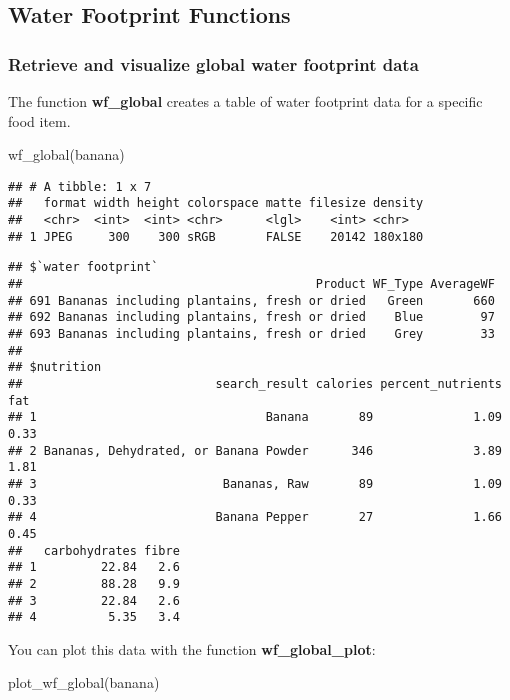 \documentclass[
]{article}
\newenvironment{Shaded}{\begin{snugshade}}{\end{snugshade}}
\newcommand{\FunctionTok}[1]{\textcolor[rgb]{0.00,0.00,0.00}{#1}}
\newcommand{\NormalTok}[1]{#1}
\begin{document}
\hypertarget{water-footprint-functions}{%
\subsection{Water Footprint Functions}\label{water-footprint-functions}}

\hypertarget{retrieve-and-visualize-global-water-footprint-data}{%
\subsubsection{Retrieve and visualize global water footprint
data}\label{retrieve-and-visualize-global-water-footprint-data}}

The function \textbf{wf\_global} creates a table of water footprint data
for a specific food item.

\begin{Shaded}
\begin{Highlighting}[]
\FunctionTok{wf\_global}\NormalTok{(banana)}
\end{Highlighting}
\end{Shaded}

\begin{verbatim}
## # A tibble: 1 x 7
##   format width height colorspace matte filesize density
##   <chr>  <int>  <int> <chr>      <lgl>    <int> <chr>  
## 1 JPEG     300    300 sRGB       FALSE    20142 180x180
\end{verbatim}

\begin{verbatim}
## $`water footprint`
##                                         Product WF_Type AverageWF
## 691 Bananas including plantains, fresh or dried   Green       660
## 692 Bananas including plantains, fresh or dried    Blue        97
## 693 Bananas including plantains, fresh or dried    Grey        33
## 
## $nutrition
##                           search_result calories percent_nutrients  fat
## 1                                Banana       89              1.09 0.33
## 2 Bananas, Dehydrated, or Banana Powder      346              3.89 1.81
## 3                          Bananas, Raw       89              1.09 0.33
## 4                         Banana Pepper       27              1.66 0.45
##   carbohydrates fibre
## 1         22.84   2.6
## 2         88.28   9.9
## 3         22.84   2.6
## 4          5.35   3.4
\end{verbatim}

You can plot this data with the function \textbf{wf\_global\_plot}:

\begin{Shaded}
\begin{Highlighting}[]
\FunctionTok{plot\_wf\_global}\NormalTok{(banana)}
\end{Highlighting}
\end{Shaded}
\end{document}
